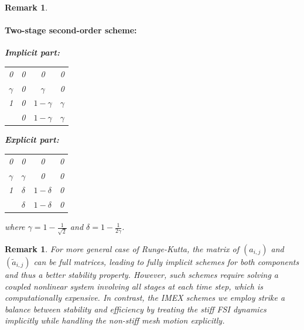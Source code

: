 \documentclass{article}
\newtheorem{remark}[theorem]{Remark}
\begin{document}
\begin{remark}
\paragraph{Two-stage second-order scheme:}
\begin{center}
    \begin{minipage}{0.45\textwidth}
\centering
\textbf{Implicit part:}
\begin{tabular}{c|ccc}
    0 & 0 & 0 & 0\\
  $\gamma$ & 0 & $\gamma$ & 0\\
  1 & 0 & $1-\gamma$ & $\gamma$\\
  \hline
    & 0 & $1-\gamma$ & $\gamma$ \\
\end{tabular}
\end{minipage}
\hfill
\begin{minipage}{0.45\textwidth}
\centering
\textbf{Explicit part:}
\begin{tabular}{c|ccc}
    0 & 0 & 0 & 0\\
  $\gamma$ & $\gamma$ & 0 & 0\\
  1 & $\delta$ & $1-\delta$ & 0\\
  \hline
    & $\delta$ & $1-\delta$ & 0\\
\end{tabular}
\end{minipage}
\end{center}
where $\gamma = 1 - \frac{1}{\sqrt{2}}$ and $\delta = 1 - \frac{1}{2\gamma}$.
\end{remark} 
\begin{remark}
    For more general case of Runge-Kutta, the matrix of $(a_{i,j})$ and $(\tilde{a}_{i,j})$ can be full matrices, leading to fully implicit schemes for both components and thus a better stability property. However, such schemes require solving a coupled nonlinear system involving all stages at each time step, which is computationally expensive. In contrast, the IMEX schemes we employ strike a balance between stability and efficiency by treating the stiff FSI dynamics implicitly while handling the non-stiff mesh motion explicitly.
\end{remark}
\end{document}
